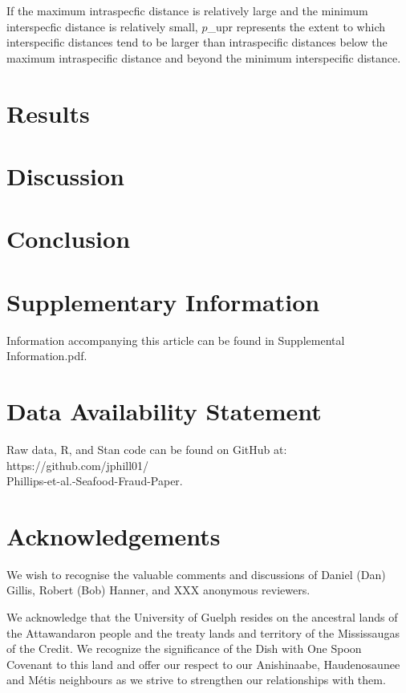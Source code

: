 \documentclass[12pt]{article}
\begin{document}
If the maximum intraspecfic distance is relatively large and the minimum interspecfic distance is relatively small, $p$\_{upr} represents the extent to which interspecific distances tend to be larger than intraspecific distances below the maximum intraspecific distance and beyond the minimum interspecific distance.


\section{Results}

\section{Discussion}

\section{Conclusion}


\newpage

\section*{Supplementary Information}

Information accompanying this article can be found in Supplemental Information.pdf.

\section*{Data Availability Statement}

Raw data, R, and Stan code can be found on GitHub at: https://github.com/jphill01/\\Phillips-et-al.-Seafood-Fraud-Paper.

\section*{Acknowledgements}

We wish to recognise the valuable comments and discussions of Daniel (Dan) Gillis, Robert (Bob) Hanner, and XXX anonymous reviewers.

We acknowledge that the University of Guelph resides on the ancestral lands of the Attawandaron people and the treaty lands and territory of the Mississaugas of the Credit. We recognize the significance of the Dish with One Spoon Covenant to this land and offer our respect to our Anishinaabe, Haudenosaunee and M{\'e}tis neighbours as we strive to strengthen our relationships with them.
\end{document}
